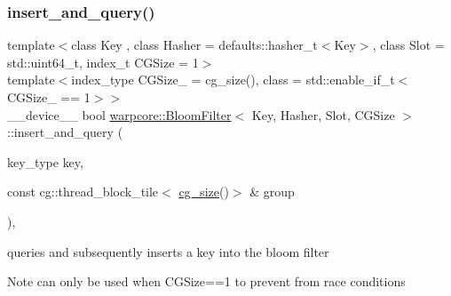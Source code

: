 \subsubsection{\texorpdfstring{insert\+\_\+and\+\_\+query()}{insert\_and\_query()}}
{\footnotesize\ttfamily template$<$class Key , class Hasher  = defaults\+::hasher\+\_\+t$<$\+Key$>$, class Slot  = std\+::uint64\+\_\+t, index\+\_\+t C\+G\+Size = 1$>$ \\
template$<$index\+\_\+type C\+G\+Size\+\_\+ = cg\+\_\+size(), class  = std\+::enable\+\_\+if\+\_\+t$<$\+C\+G\+Size\+\_\+ == 1$>$$>$ \\
\+\_\+\+\_\+device\+\_\+\+\_\+ bool \hyperlink{classwarpcore_1_1BloomFilter}{warpcore\+::\+Bloom\+Filter}$<$ Key, Hasher, Slot, C\+G\+Size $>$\+::insert\+\_\+and\+\_\+query (\begin{DoxyParamCaption}\item[{key\+\_\+type}]{key,  }\item[{const cg\+::thread\+\_\+block\+\_\+tile$<$ \hyperlink{classwarpcore_1_1BloomFilter_a6ad2335811852ad62fc65e85416d3904}{cg\+\_\+size}()$>$ \&}]{group }\end{DoxyParamCaption})\hspace{0.3cm}{\ttfamily [inline]}, {\ttfamily [noexcept]}}



queries and subsequently inserts a key into the bloom filter 

\begin{DoxyNote}{Note}
can only be used when {\ttfamily C\+G\+Size==1} to prevent from race conditions 
\end{DoxyNote}

